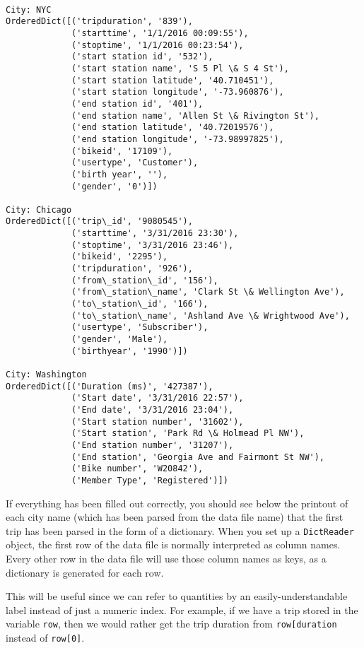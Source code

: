 \documentclass[11pt]{article}
\begin{document}
    \begin{Verbatim}[commandchars=\\\{\}]

City: NYC
OrderedDict([('tripduration', '839'),
             ('starttime', '1/1/2016 00:09:55'),
             ('stoptime', '1/1/2016 00:23:54'),
             ('start station id', '532'),
             ('start station name', 'S 5 Pl \& S 4 St'),
             ('start station latitude', '40.710451'),
             ('start station longitude', '-73.960876'),
             ('end station id', '401'),
             ('end station name', 'Allen St \& Rivington St'),
             ('end station latitude', '40.72019576'),
             ('end station longitude', '-73.98997825'),
             ('bikeid', '17109'),
             ('usertype', 'Customer'),
             ('birth year', ''),
             ('gender', '0')])

City: Chicago
OrderedDict([('trip\_id', '9080545'),
             ('starttime', '3/31/2016 23:30'),
             ('stoptime', '3/31/2016 23:46'),
             ('bikeid', '2295'),
             ('tripduration', '926'),
             ('from\_station\_id', '156'),
             ('from\_station\_name', 'Clark St \& Wellington Ave'),
             ('to\_station\_id', '166'),
             ('to\_station\_name', 'Ashland Ave \& Wrightwood Ave'),
             ('usertype', 'Subscriber'),
             ('gender', 'Male'),
             ('birthyear', '1990')])

City: Washington
OrderedDict([('Duration (ms)', '427387'),
             ('Start date', '3/31/2016 22:57'),
             ('End date', '3/31/2016 23:04'),
             ('Start station number', '31602'),
             ('Start station', 'Park Rd \& Holmead Pl NW'),
             ('End station number', '31207'),
             ('End station', 'Georgia Ave and Fairmont St NW'),
             ('Bike number', 'W20842'),
             ('Member Type', 'Registered')])

    \end{Verbatim}

    If everything has been filled out correctly, you should see below the
printout of each city name (which has been parsed from the data file
name) that the first trip has been parsed in the form of a dictionary.
When you set up a \texttt{DictReader} object, the first row of the data
file is normally interpreted as column names. Every other row in the
data file will use those column names as keys, as a dictionary is
generated for each row.

This will be useful since we can refer to quantities by an
easily-understandable label instead of just a numeric index. For
example, if we have a trip stored in the variable \texttt{row}, then we
would rather get the trip duration from
\texttt{row{[}\textquotesingle{}duration\textquotesingle{}{]}} instead
of \texttt{row{[}0{]}}.
\end{document}
